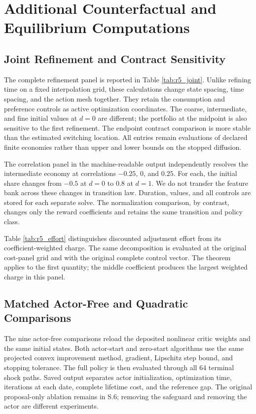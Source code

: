 \section{Additional Counterfactual and Equilibrium Computations}
\subsection{Joint Refinement and Contract Sensitivity}
The complete refinement panel is reported in Table \ref{tab:r5_joint}. Unlike refining time on a fixed interpolation grid, these calculations change state spacing, time spacing, and the action mesh together. They retain the consumption and preference controls as active optimization coordinates. The coarse, intermediate, and fine initial values at $d=0$ are different; the portfolio at the midpoint is also sensitive to the first refinement. The endpoint contract comparison is more stable than the estimated switching location. All entries remain evaluations of declared finite economies rather than upper and lower bounds on the stopped diffusion.


The correlation panel in the machine-readable output independently resolves the intermediate economy at correlations $-0.25$, $0$, and $0.25$. For each, the initial share changes from $-0.5$ at $d=0$ to $0.8$ at $d=1$. We do not transfer the feature bank across these changes in transition law. Duration, values, and all controls are stored for each separate solve. The normalization comparison, by contrast, changes only the reward coefficients and retains the same transition and policy class.

Table \ref{tab:r5_effort} distinguishes discounted adjustment effort from its coefficient-weighted charge. The same decomposition is evaluated at the original cost-panel grid and with the original complete control vector. The theorem applies to the first quantity; the middle coefficient produces the largest weighted charge in this panel.


\subsection{Matched Actor-Free and Quadratic Comparisons}
The nine actor-free comparisons reload the deposited nonlinear critic weights and the same initial states. Both actor-start and zero-start algorithms use the same projected convex improvement method, gradient, Lipschitz step bound, and stopping tolerance. The full policy is then evaluated through all 64 terminal shock paths. Saved output separates actor initialization, optimization time, iterations at each date, complete lifetime cost, and the reference gap. The original proposal-only ablation remains in S.6; removing the safeguard and removing the actor are different experiments.

